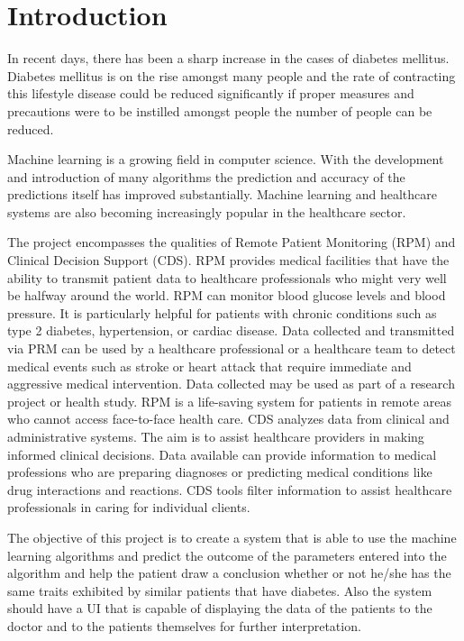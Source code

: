\documentclass[12pt]{article}
\begin{document}
\newpage
\tableofcontents
\newpage
\listoffigures
\newpage
\listoftables
\newpage


\begin{abstract}

\end{abstract}
\onehalfspacing
\section{Introduction}
In recent days, there has been a sharp increase in the cases of diabetes mellitus. Diabetes mellitus is on the rise amongst many people and the rate of contracting this lifestyle disease could be reduced significantly if proper measures and precautions were to be instilled amongst people the number of people can be reduced.

Machine learning is a growing field in computer science. With the development and introduction of many algorithms the prediction and accuracy of the predictions itself has improved substantially. Machine learning and healthcare systems are also becoming increasingly popular in the healthcare sector.

The project encompasses the qualities of Remote Patient Monitoring (RPM) and Clinical Decision Support (CDS). RPM provides medical facilities that have the ability to transmit patient data to healthcare professionals who might very well be halfway around the world. RPM can monitor blood glucose levels and blood pressure. It is particularly helpful for patients with chronic conditions such as type 2 diabetes, hypertension, or cardiac disease. Data collected and transmitted via PRM can be used by a healthcare professional or a healthcare team to detect medical events such as stroke or heart attack that require immediate and aggressive medical intervention. Data collected may be used as part of a research project or health study. RPM is a life-saving system for patients in remote areas who cannot access face-to-face health care. CDS analyzes data from clinical and administrative systems. The aim is to assist healthcare providers in making informed clinical decisions. Data available can provide information to medical professions who are preparing diagnoses or predicting medical conditions like drug interactions and reactions. CDS tools filter information to assist healthcare professionals in caring for individual clients. 

The objective of this project is to create a  system that is able to use the machine learning algorithms and predict the outcome of the parameters entered into the algorithm and help the patient draw a conclusion whether or not he/she has the same traits exhibited by similar patients that have diabetes. Also the system should have a UI that is capable of displaying the data of the patients to the doctor and to the patients themselves for further interpretation.
\end{document}
